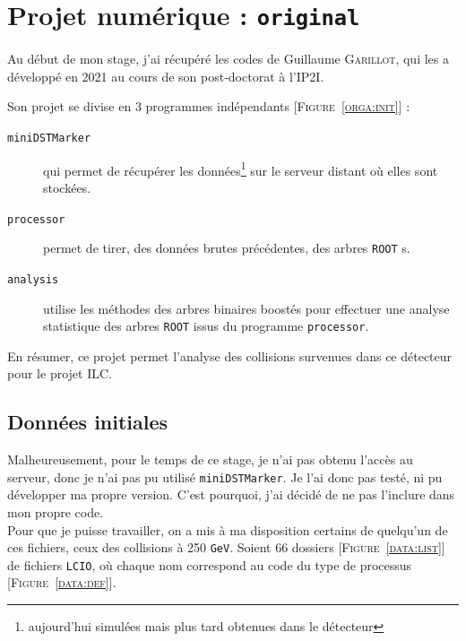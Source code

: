 \documentclass[10pt,a4paper]{report}
\newcommand{\ROOT}{\texttt{ROOT}\xspace}
\newcommand{\LCIO}{\texttt{LCIO}\xspace}
\newcommand{\original}{\texttt{original}\xspace}
\newcommand{\GeV}{\texttt{GeV}}
\newcommand{\Figure}[1]{[\textsc{Figure~#1}]}
\begin{document}
\section{Projet numérique : \original}

Au début de mon stage, j'ai récupéré les codes de Guillaume \textsc{Garillot}, qui les a développé en 2021 au cours de son post-doctorat à l'IP2I. 

Son projet se divise en 3 programmes indépendants \Figure{\ref{orga:init}} :

\begin{description}
	
	\item[\texttt{miniDSTMarker}] qui permet de récupérer les données\footnote{aujourd'hui simulées mais plus tard obtenues dans le détecteur} sur le serveur distant où elles sont stockées.
	
	\item[\texttt{processor}] permet de tirer, des données brutes précédentes, des arbres \ROOT s.
	
	\item[\texttt{analysis}] utilise les méthodes des arbres binaires boostés pour effectuer une analyse statistique des arbres \ROOT issus du programme \texttt{processor}.
	
\end{description} 



En résumer, ce projet permet l'analyse des collisions survenues dans ce détecteur pour le projet ILC.


\subsection{Données initiales}


Malheureusement, pour le temps de ce stage, je n'ai pas obtenu l'accès au serveur, donc je n'ai pas pu utilisé \texttt{miniDSTMarker}. Je l'ai donc pas testé, ni pu développer ma propre version. C'est pourquoi, j'ai décidé de ne pas l'inclure dans mon propre code.\\

Pour que je puisse travailler, on a mis à ma disposition certains de quelqu'un de ces fichiers, ceux des collisions à 250 \GeV. Soient 66 dossiers \Figure{\ref{data:list}} de fichiers \LCIO, où chaque nom correspond au code du type de processus \Figure{\ref{data:def}}.
\end{document}
